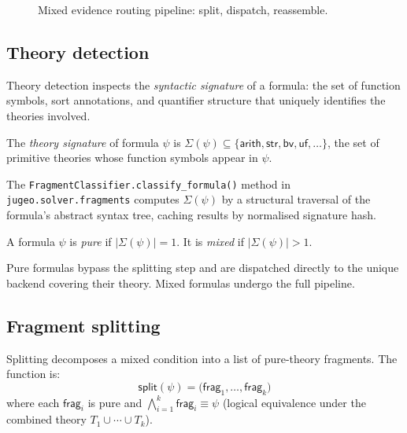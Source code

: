 \documentclass[11pt]{article}
\newcommand{\VC}{\psi}                    %
\newcommand{\Frag}[1]{\mathsf{frag}_{#1}} %
\newcommand{\Split}{\mathsf{split}}       %
\newcommand{\Reassemble}{\mathsf{reassemble}} %
\newcommand{\Dispatch}{\mathsf{dispatch}} %
\newcommand{\Tharith}{\mathsf{arith}}     %
\newcommand{\Thstr}{\mathsf{str}}         %
\newcommand{\Thbv}{\mathsf{bv}}           %
\newcommand{\Thuf}{\mathsf{uf}}           %
\begin{document}
\begin{figure}[h]
\centering
{}
\caption{Mixed evidence routing pipeline: split, dispatch, reassemble.}
\label{fig:pipeline}
\end{figure}

\subsection{Theory detection}\label{sec:theory-detect}

Theory detection inspects the \emph{syntactic signature} of a formula:
the set of function symbols, sort annotations, and quantifier structure
that uniquely identifies the theories involved.

\begin{definition}\label{def:theory-sig}
The \emph{theory signature} of formula $\VC$ is
$\Sigma(\VC) \subseteq \{\Tharith, \Thstr, \Thbv, \Thuf, \ldots\}$,
the set of primitive theories whose function symbols appear in $\VC$.
\end{definition}

The \texttt{FragmentClassifier.classify\_formula()} method in
\texttt{jugeo.solver.fragments} computes $\Sigma(\VC)$ by a structural
traversal of the formula's abstract syntax tree, caching results by
normalised signature hash.

\begin{definition}\label{def:purity}
A formula $\VC$ is \emph{pure} if $|\Sigma(\VC)| = 1$.  It is
\emph{mixed} if $|\Sigma(\VC)| > 1$.
\end{definition}

Pure formulas bypass the splitting step and are dispatched directly to
the unique backend covering their theory.  Mixed formulas undergo the
full pipeline.

\subsection{Fragment splitting}\label{sec:splitting}

Splitting decomposes a mixed condition into a list of pure-theory
fragments.  The function is:
\[
  \Split(\VC) = \bigl(\Frag{1}, \ldots, \Frag{k}\bigr)
\]
where each $\Frag{i}$ is pure and
$\bigwedge_{i=1}^k \Frag{i} \equiv \VC$ (logical equivalence under
the combined theory $T_1 \cup \cdots \cup T_k$).
\end{document}
